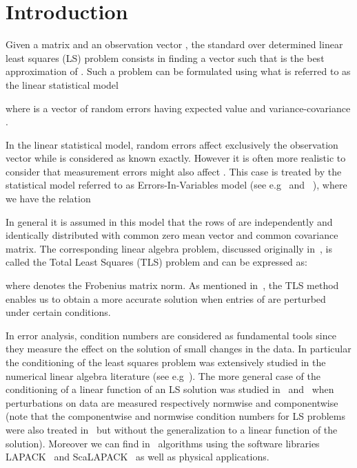 \documentclass[a4paper]{article}
\begin{document}
\makeRR   



\section{Introduction}
Given a matrix  and an observation vector , the standard
over determined linear least squares (LS) problem consists in finding a vector  such that  is the best approximation of .
Such a problem can be formulated using what is referred to as the linear statistical model

where  is a vector of random errors having expected value
 and variance-covariance .

In the linear statistical model, random errors affect exclusively the observation vector  while  is considered as known exactly. However it is often more realistic to consider that measurement errors might also affect .
This case is treated by the statistical model referred to as Errors-In-Variables model (see e.g~\cite[p. 230]{vava91} and ~\cite[p. 176]{BJORCK}),
where we have the relation

In general it is assumed in this model that the rows of  are independently and identically distributed with common zero mean vector and common covariance matrix.
The corresponding linear algebra problem, discussed originally in~\cite{GVL.80}, is
called the Total Least Squares (TLS) problem and can be expressed as:

where  denotes the Frobenius matrix norm.
As mentioned in~\cite[p. 238]{vava91}, the TLS method enables us to obtain a more
accurate solution when entries of  are perturbed under certain conditions.

In error analysis, condition numbers are considered as fundamental tools since they
measure the effect on the solution of small changes in the data.
In particular the conditioning of the least squares problem was extensively studied in the numerical linear algebra literature (see e.g~\cite{BJORCK,CHA.IPS.95,COHI.99.1,CDW.07,ELDEN,GR.96,HIGHAM,IPSEN,KEN.LAU.98,STEWART}).
The more general case of the conditioning of a linear function of an LS solution was studied
in~\cite{ABG.07} and~\cite{BG.09} when perturbations on data are measured respectively normwise and componentwise
(note that the componentwise and normwise condition numbers for LS problems were also treated in~\cite{CDW.07} but without the generalization to a linear function of the solution).
Moreover we can find in~\cite{BDGL.09} algorithms
using the software libraries LAPACK~\cite{LAPACK} and ScaLAPACK~\cite{SCALAPACK}
as well as physical applications.
\end{document}
